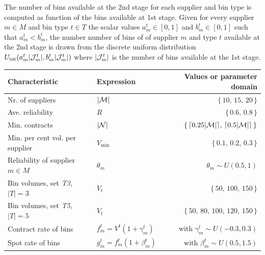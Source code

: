 \documentclass[a4paper,11pt]{article}
\begin{document}
	The number of bins available at the 2nd stage for each supplier and bin type is computed as function of the bins available at 1st stage.
	Given for every supplier $ m \in M$ and bin type $ t \in T$ the scalar values $ a^t_m \in [0,1]$ and $ b^t_m \in [0,1]$ such that $ a^t_m < b^t_m$, the number number of bins of  of supplier $ m$ and type $ t$ available at the 2nd stage is drawn from the discrete uniform distribution $ U_{\text{int}}( a^t_m | {\cal J}^t_m |, b^t_m | {\cal J}^t_m |)$ where $ | {\cal J}^t_m |$ is the number of bins available at the 1st stage.
	\begin{table}[htb!]
		\footnotesize
		\centering
		\begin{tabular}{llr}
			\hline
			Characteristic & Expression & Values or parameter domain \\
			\hline
			Nr. of suppliers                                    & $|{\cal M}| $                           & $ \{ \, 10, \, 15, \, 20 \, \}$ \\
			Ave. reliability                                    & $R $                                    & $ \{\, 0.6, \, 0.8 \, \}$ \\
			Min. contracts                                      & $|{\cal N}| $                           & $ \{ \, \lceil 0.25 |{\cal M}| \rceil, \, \lceil 0.5 |{\cal M}| \rceil \, \}$ \\
			Min. per cent vol. per supplier                     & $V_{\text{min}}$                        & $  \{\, 0.1, \, 0.2, \, 0.3 \,\}$ \\
			Reliability of supplier $ m \in M$                  & $\theta_{m}$                            & $ \theta_{m} \sim U(0.5, 1)$ \\
			
			Bin volumes, set \textit{T3},       $ |T| = 3 $     & $ V_t          $                        & $ \{ \, 50, \, 100, \, 150 \, \}$ \\
			Bin volumes, set \textit{T5},       $ |T| = 5 $     & $ V_t          $                        & $ \{ \, 50, \, 80, \, 100, \, 120, \, 150 \, \}$ \\
			
			Contract rate of bins                               & $f^t_m =    V^t (1 + \gamma^t_m)$       & with $\gamma^t_m \sim U(-0.3,0.3)$  \\
			Spot rate of bins                                   & $g^t_m = f^t_m (1 + \beta^t_m) $        & with $\beta^t_m \sim U(0.5, 1.5)$  \\


\end{tabular}
\end{table}
\end{document}

